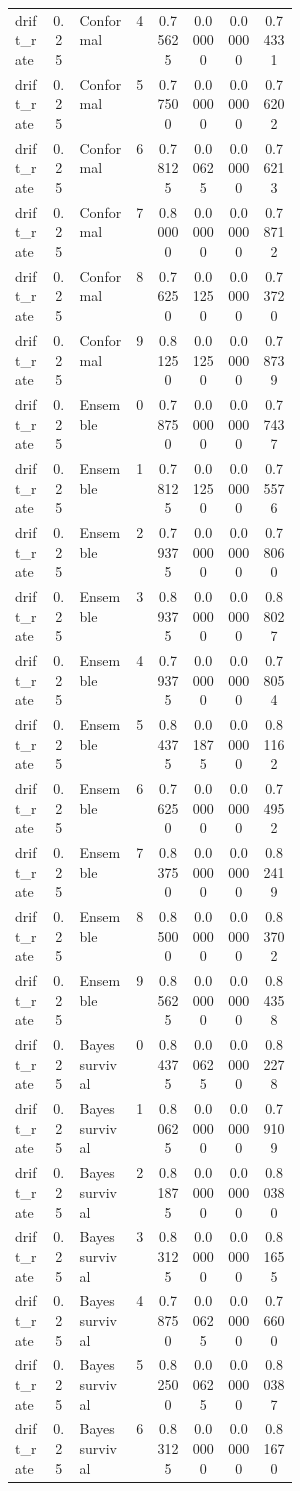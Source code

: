 \documentclass{article}
\begin{document}
\begin{center}
\begin{longtable}{p{0.13\linewidth}cp{0.20\linewidth}ccccc}
drift\_rate & 0.25 & Conformal & 4 & 0.75625 & 0.00000 & 0.00000 & 0.74331\\
drift\_rate & 0.25 & Conformal & 5 & 0.77500 & 0.00000 & 0.00000 & 0.76202\\
drift\_rate & 0.25 & Conformal & 6 & 0.78125 & 0.00625 & 0.00000 & 0.76213\\
drift\_rate & 0.25 & Conformal & 7 & 0.80000 & 0.00000 & 0.00000 & 0.78712\\
drift\_rate & 0.25 & Conformal & 8 & 0.76250 & 0.01250 & 0.00000 & 0.73720\\
drift\_rate & 0.25 & Conformal & 9 & 0.81250 & 0.01250 & 0.00000 & 0.78739\\
drift\_rate & 0.25 & Ensemble & 0 & 0.78750 & 0.00000 & 0.00000 & 0.77437\\
drift\_rate & 0.25 & Ensemble & 1 & 0.78125 & 0.01250 & 0.00000 & 0.75576\\
drift\_rate & 0.25 & Ensemble & 2 & 0.79375 & 0.00000 & 0.00000 & 0.78060\\
drift\_rate & 0.25 & Ensemble & 3 & 0.89375 & 0.00000 & 0.00000 & 0.88027\\
drift\_rate & 0.25 & Ensemble & 4 & 0.79375 & 0.00000 & 0.00000 & 0.78054\\
drift\_rate & 0.25 & Ensemble & 5 & 0.84375 & 0.01875 & 0.00000 & 0.81162\\
drift\_rate & 0.25 & Ensemble & 6 & 0.76250 & 0.00000 & 0.00000 & 0.74952\\
drift\_rate & 0.25 & Ensemble & 7 & 0.83750 & 0.00000 & 0.00000 & 0.82419\\
drift\_rate & 0.25 & Ensemble & 8 & 0.85000 & 0.00000 & 0.00000 & 0.83702\\
drift\_rate & 0.25 & Ensemble & 9 & 0.85625 & 0.00000 & 0.00000 & 0.84358\\
drift\_rate & 0.25 & Bayes survival & 0 & 0.84375 & 0.00625 & 0.00000 & 0.82278\\
drift\_rate & 0.25 & Bayes survival & 1 & 0.80625 & 0.00000 & 0.00000 & 0.79109\\
drift\_rate & 0.25 & Bayes survival & 2 & 0.81875 & 0.00000 & 0.00000 & 0.80380\\
drift\_rate & 0.25 & Bayes survival & 3 & 0.83125 & 0.00000 & 0.00000 & 0.81655\\
drift\_rate & 0.25 & Bayes survival & 4 & 0.78750 & 0.00625 & 0.00000 & 0.76600\\
drift\_rate & 0.25 & Bayes survival & 5 & 0.82500 & 0.00625 & 0.00000 & 0.80387\\
drift\_rate & 0.25 & Bayes survival & 6 & 0.83125 & 0.00000 & 0.00000 & 0.81670\\

\end{longtable}
\end{center}
\end{document}
